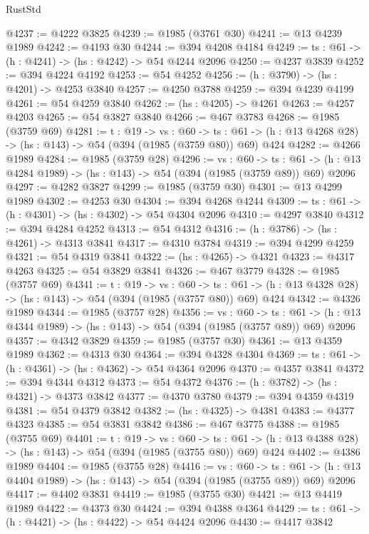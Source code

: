 \begin{lexlean}{RustStd}
\begin{coremodule}
@4237 := @4222 @3825
@4239 := @1985 (@3761 @30)
@4241 := @13 @4239 @1989
@4242 := @4193 @30
@4244 := @394 @4208 @4184
@4249 := {ts : @61} -> (h : @4241) -> (hs : @4242) -> @54 @4244 @2096
@4250 := @4237 @3839
@4252 := @394 @4224 @4192
@4253 := @54 @4252
@4256 := (h : @3790) -> (hs : @4201) -> @4253 @3840
@4257 := @4250 @3788
@4259 := @394 @4239 @4199
@4261 := @54 @4259 @3840
@4262 := (hs : @4205) -> @4261
@4263 := @4257 @4203
@4265 := @54 @3827 @3840
@4266 := @467 @3783
@4268 := @1985 (@3759 @69)
@4281 := {t : @19} ->
  {vs : @60} ->
  {ts : @61} -> (h : @13 @4268 @28) -> (hs : @143) -> @54 (@394 (@1985 (@3759 @80)) @69) @424
@4282 := @4266 @1989
@4284 := @1985 (@3759 @28)
@4296 := {vs : @60} ->
  {ts : @61} -> (h : @13 @4284 @1989) -> (hs : @143) -> @54 (@394 (@1985 (@3759 @89)) @69) @2096
@4297 := @4282 @3827
@4299 := @1985 (@3759 @30)
@4301 := @13 @4299 @1989
@4302 := @4253 @30
@4304 := @394 @4268 @4244
@4309 := {ts : @61} -> (h : @4301) -> (hs : @4302) -> @54 @4304 @2096
@4310 := @4297 @3840
@4312 := @394 @4284 @4252
@4313 := @54 @4312
@4316 := (h : @3786) -> (hs : @4261) -> @4313 @3841
@4317 := @4310 @3784
@4319 := @394 @4299 @4259
@4321 := @54 @4319 @3841
@4322 := (hs : @4265) -> @4321
@4323 := @4317 @4263
@4325 := @54 @3829 @3841
@4326 := @467 @3779
@4328 := @1985 (@3757 @69)
@4341 := {t : @19} ->
  {vs : @60} ->
  {ts : @61} -> (h : @13 @4328 @28) -> (hs : @143) -> @54 (@394 (@1985 (@3757 @80)) @69) @424
@4342 := @4326 @1989
@4344 := @1985 (@3757 @28)
@4356 := {vs : @60} ->
  {ts : @61} -> (h : @13 @4344 @1989) -> (hs : @143) -> @54 (@394 (@1985 (@3757 @89)) @69) @2096
@4357 := @4342 @3829
@4359 := @1985 (@3757 @30)
@4361 := @13 @4359 @1989
@4362 := @4313 @30
@4364 := @394 @4328 @4304
@4369 := {ts : @61} -> (h : @4361) -> (hs : @4362) -> @54 @4364 @2096
@4370 := @4357 @3841
@4372 := @394 @4344 @4312
@4373 := @54 @4372
@4376 := (h : @3782) -> (hs : @4321) -> @4373 @3842
@4377 := @4370 @3780
@4379 := @394 @4359 @4319
@4381 := @54 @4379 @3842
@4382 := (hs : @4325) -> @4381
@4383 := @4377 @4323
@4385 := @54 @3831 @3842
@4386 := @467 @3775
@4388 := @1985 (@3755 @69)
@4401 := {t : @19} ->
  {vs : @60} ->
  {ts : @61} -> (h : @13 @4388 @28) -> (hs : @143) -> @54 (@394 (@1985 (@3755 @80)) @69) @424
@4402 := @4386 @1989
@4404 := @1985 (@3755 @28)
@4416 := {vs : @60} ->
  {ts : @61} -> (h : @13 @4404 @1989) -> (hs : @143) -> @54 (@394 (@1985 (@3755 @89)) @69) @2096
@4417 := @4402 @3831
@4419 := @1985 (@3755 @30)
@4421 := @13 @4419 @1989
@4422 := @4373 @30
@4424 := @394 @4388 @4364
@4429 := {ts : @61} -> (h : @4421) -> (hs : @4422) -> @54 @4424 @2096
@4430 := @4417 @3842

\end{coremodule}
\end{lexlean}
